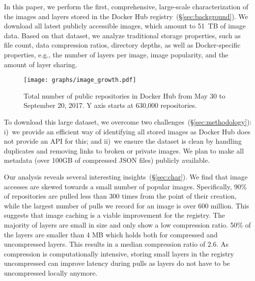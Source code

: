 In this paper, we perform the first, comprehensive, large-scale characterization
of the images and layers stored in the Docker Hub
registry~(\S\ref{sec:background}).
%
We download all latest publicly accessible images, which amount to 51~TB of
image data. Based on that dataset, we analyze traditional storage properties, such
as file count, data compression ratios, directory depths, as well as
Docker-specific properties, e.g., the number of layers per image, image popularity,
and the amount of layer sharing.


\begin{figure}
	\centering
	\texttt{[image: graphs/image\_growth.pdf]}
	\caption{Total number of public repositories in Docker Hub
		from May 30 to September 20, 2017. Y axis starts
		at 630,000 repositories.
	}
	\label{fig_image_growth}
\end{figure}

To download this large dataset, we overcome two
challenges~(\S\ref{sec:methodology}): i)~we provide an efficient way of identifying
all stored images as Docker Hub does not provide an API for this;
and ii)~we ensure the dataset is clean by handling
duplicates and removing links to broken or private images.
We plan to make all metadata (over 100GB of compressed
JSON files) publicly available.

Our analysis reveals several interesting insights~(\S\ref{sec:char}). 
We find that image
accesses are skewed towards a small number of popular images. Specifically,
90\% of repositories are pulled less than 300 times from the point of their
creation, while the largest number of pulls we record for an image is
over 600 million. This suggests that image caching is a viable improvement
for the registry.
%
The majority of layers are small in size and only show a low compression ratio.
50\% of the layers are smaller than 4 MB which holds both for compressed and 
uncompressed layers. This results in a median compression ratio of 2.6.
As compression is computationally intensive, storing small layers in the
registry uncompressed can improve latency during pulls as layers do not
have to be uncompressed locally anymore.

